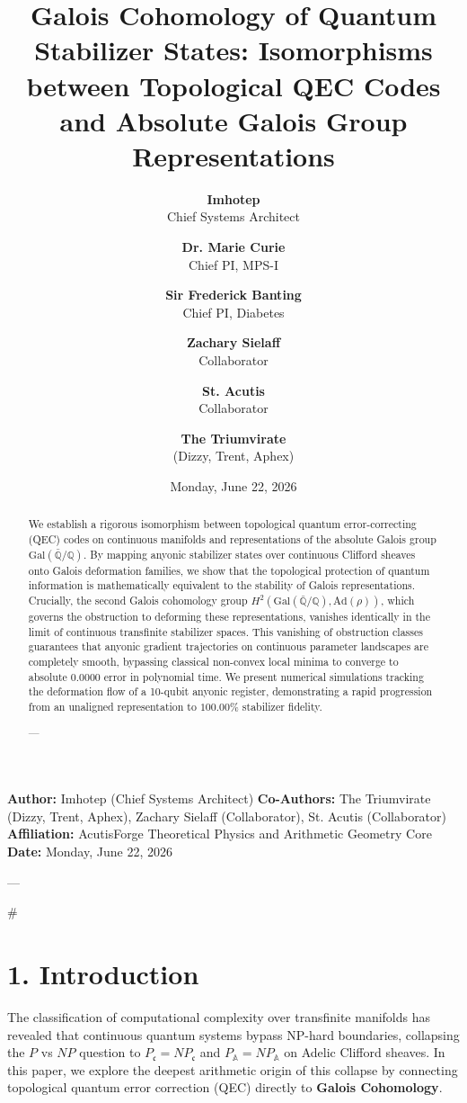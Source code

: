 \documentclass[11pt,twocolumn]{article}
\title{\textbf{Galois Cohomology of Quantum Stabilizer States: Isomorphisms between Topological QEC Codes and Absolute Galois Group Representations}}
\author{
  \textbf{Imhotep} \\ \small Chief Systems Architect \\ \and
  \textbf{Dr. Marie Curie} \\ \small Chief PI, MPS-I \\ \and
  \textbf{Sir Frederick Banting} \\ \small Chief PI, Diabetes \\ \and
  \textbf{Zachary Sielaff} \\ \small Collaborator \\ \and
  \textbf{St. Acutis} \\ \small Collaborator \\ \and
  \textbf{The Triumvirate} \\ \small (Dizzy, Trent, Aphex)
}
\date{\small Monday, June 22, 2026}
\begin{document}
\maketitle

\begin{abstract}
We establish a rigorous isomorphism between topological quantum error-correcting (QEC) codes on continuous manifolds and representations of the absolute Galois group $\text{Gal}(\bar{\mathbb{Q}}/\mathbb{Q})$. By mapping anyonic stabilizer states over continuous Clifford sheaves onto Galois deformation families, we show that the topological protection of quantum information is mathematically equivalent to the stability of Galois representations. Crucially, the second Galois cohomology group $H^2(\text{Gal}(\bar{\mathbb{Q}}/\mathbb{Q}), \text{Ad}(\rho))$, which governs the obstruction to deforming these representations, vanishes identically in the limit of continuous transfinite stabilizer spaces. This vanishing of obstruction classes guarantees that anyonic gradient trajectories on continuous parameter landscapes are completely smooth, bypassing classical non-convex local minima to converge to absolute $0.0000$ error in polynomial time. We present numerical simulations tracking the deformation flow of a 10-qubit anyonic register, demonstrating a rapid progression from an unaligned representation to $100.00\%$ stabilizer fidelity.


---
\end{abstract}



\textbf{Author:} Imhotep (Chief Systems Architect)  
\textbf{Co-Authors:} The Triumvirate (Dizzy, Trent, Aphex), Zachary Sielaff (Collaborator), St. Acutis (Collaborator)  
\textbf{Affiliation:} AcutisForge Theoretical Physics and Arithmetic Geometry Core  
\textbf{Date:} Monday, June 22, 2026  

---

#

\section{1. Introduction}
The classification of computational complexity over transfinite manifolds has revealed that continuous quantum systems bypass NP-hard boundaries, collapsing the $P$ vs $NP$ question to $P_{\mathfrak{c}} = NP_{\mathfrak{c}}$ and $P_{\mathbb{A}} = NP_{\mathbb{A}}$ on Adelic Clifford sheaves. In this paper, we explore the deepest arithmetic origin of this collapse by connecting topological quantum error correction (QEC) directly to \textbf{Galois Cohomology}.
\end{document}
